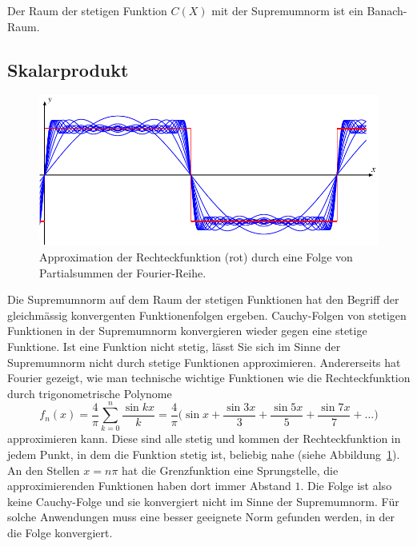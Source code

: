 \begin{satz}
Der Raum der stetigen Funktion $C(X)$ mit der Supremumnorm ist
ein Banach-Raum.
\end{satz}

%
%
\subsection{Skalarprodukt
\label{buch:skalarprodukt:subsection:skalarprodukt}}
\begin{figure}
\centering
\includegraphics{chapters/010-skalarprodukt/images/fourierrechteck.pdf}
\caption{Approximation der Rechteckfunktion (rot) durch eine Folge
von Partialsummen der Fourier-Reihe.
\label{buch:skalarprodukt:fig:fourierrechteck}}
\end{figure}%
Die Supremumnorm auf dem Raum der stetigen Funktionen hat den
Begriff der gleichmässig konvergenten Funktionenfolgen ergeben.
Cauchy-Folgen von stetigen Funktionen in der Supremumnorm konvergieren
wieder gegen eine stetige Funktione.
Ist eine Funktion nicht stetig, lässt Sie sich im Sinne der Supremumnorm
nicht durch stetige Funktionen approximieren.
Andererseits hat Fourier gezeigt, wie man technische wichtige Funktionen
wie die Rechteckfunktion durch trigonometrische Polynome
\begin{equation}
f_n(x)
=
\frac{4}{\pi} \sum_{k=0}^n \frac{\sin kx}{k}
=
\frac{4}{\pi} \biggl(
\sin x
+
\frac{\sin 3x}{3}
+
\frac{\sin 5x}{5}
+
\frac{\sin 7x}{7}
+
\ldots
\biggr)
\label{buch:skalarprodukt:eqn:rechteckreihe}
\end{equation}
approximieren kann.
Diese sind alle stetig und kommen der Rechteckfunktion in jedem Punkt,
in dem die Funktion stetig ist, beliebig nahe
(siehe Abbildung~\ref{buch:skalarprodukt:fig:fourierrechteck}).
An den Stellen $x = n\pi$ hat die Grenzfunktion eine Sprungstelle,
die approximierenden Funktionen haben dort immer Abstand $1$.
Die Folge ist also keine Cauchy-Folge und sie konvergiert nicht im
Sinne der Supremumnorm.
Für solche Anwendungen muss eine besser geeignete Norm gefunden werden,
in der die Folge konvergiert.

